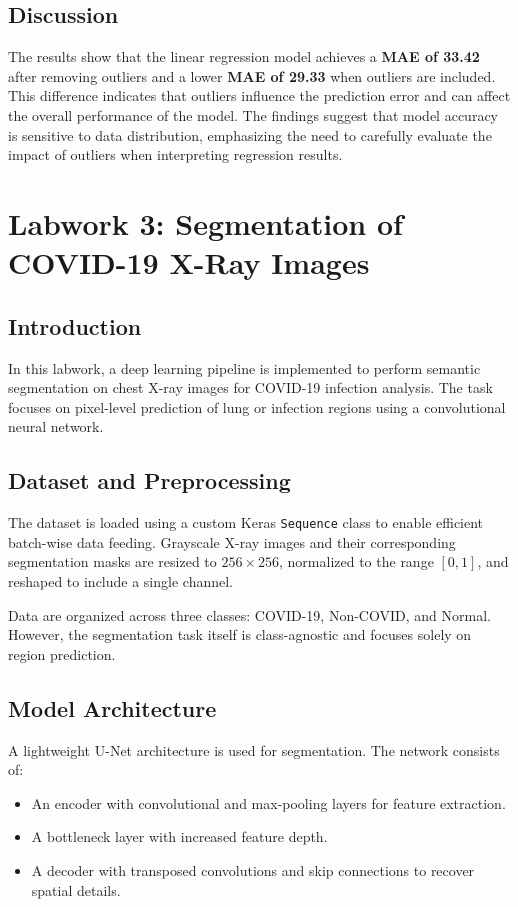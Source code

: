 \documentclass[conference]{IEEEtran}
\begin{document}
\subsection{Discussion}

The results show that the linear regression model achieves a \textbf{MAE of 33.42} after removing outliers and a lower \textbf{MAE of 29.33} when outliers are included. This difference indicates that outliers influence the prediction error and can affect the overall performance of the model. The findings suggest that model accuracy is sensitive to data distribution, emphasizing the need to carefully evaluate the impact of outliers when interpreting regression results.

\section{Labwork 3: Segmentation of COVID-19 X-Ray Images}

\subsection{Introduction}

In this labwork, a deep learning pipeline is implemented to perform semantic segmentation on chest X-ray images for COVID-19 infection analysis. The task focuses on pixel-level prediction of lung or infection regions using a convolutional neural network.

\subsection{Dataset and Preprocessing}

The dataset is loaded using a custom Keras \texttt{Sequence} class to enable efficient batch-wise data feeding. Grayscale X-ray images and their corresponding segmentation masks are resized to $256 \times 256$, normalized to the range $[0,1]$, and reshaped to include a single channel.

Data are organized across three classes: COVID-19, Non-COVID, and Normal. However, the segmentation task itself is class-agnostic and focuses solely on region prediction.

\subsection{Model Architecture}

A lightweight U-Net architecture is used for segmentation. The network consists of:
\begin{itemize}
    \item An encoder with convolutional and max-pooling layers for feature extraction.
    \item A bottleneck layer with increased feature depth.
    \item A decoder with transposed convolutions and skip connections to recover spatial details.
\end{itemize}
\end{document}
